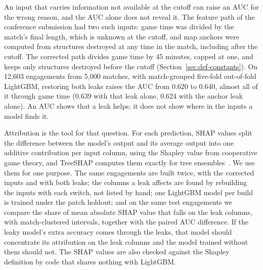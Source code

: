 An input that carries information not available at the cutoff can raise an AUC for the wrong reason, and
the AUC alone does not reveal it. The feature path of the conference submission had two such inputs:
game time was divided by the match's final length, which is unknown at the cutoff, and map anchors were
computed from structures destroyed at any time in the match, including after the cutoff. The corrected
path divides game time by 45 minutes, capped at one, and keeps only structures destroyed before the cutoff
(Section~\ref{sec:def-constants}). On 12,603 engagements from 5,000 matches, with match-grouped five-fold
out-of-fold LightGBM, restoring both leaks raises the AUC from 0.620 to 0.640, almost all of it through
game time (0.639 with that leak alone, 0.624 with the anchor leak alone). An AUC shows that a leak helps;
it does not show where in the inputs a model finds it.

Attribution is the tool for that question. For each prediction, SHAP values split the difference between
the model's output and its average output into one additive contribution per input column, using the
Shapley value from cooperative game theory, and TreeSHAP computes them exactly for tree
ensembles~\cite{lundberg2020local}. We use them for one purpose. The same engagements are built twice,
with the corrected inputs and with both leaks; the columns a leak affects are found by rebuilding the
inputs with each switch, not listed by hand; one LightGBM model per build is trained under the patch
holdout; and on the same test engagements we compare the share of mean absolute SHAP value that falls on
the leak columns, with match-clustered intervals, together with the paired AUC difference. If the leaky
model's extra accuracy comes through the leaks, that model should concentrate its attribution on the leak
columns and the model trained without them should not. The SHAP values are also
checked against the Shapley definition by code that shares nothing with LightGBM.

